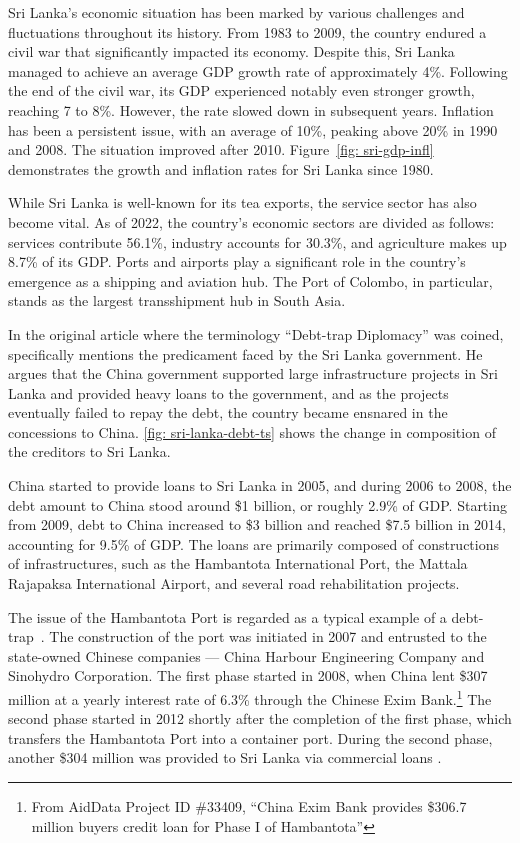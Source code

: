 Sri Lanka's economic situation has been marked by various challenges and fluctuations throughout its history. From 1983 to 2009, the country endured a civil war that significantly impacted its economy. Despite this, Sri Lanka managed to achieve an average GDP growth rate of approximately 4\%. Following the end of the civil war, its GDP experienced notably even stronger growth, reaching 7 to 8\%. However, the rate slowed down in subsequent years. Inflation has been a persistent issue, with an average of 10\%, peaking above 20\% in 1990 and 2008. The situation improved after 2010. Figure~\ref{fig: sri-gdp-infl} demonstrates the growth and inflation rates for Sri Lanka since 1980.

While Sri Lanka is well-known for its tea exports, the service sector has also become vital. As of 2022, the country's economic sectors are divided as follows: services contribute 56.1\%, industry accounts for 30.3\%, and agriculture makes up 8.7\% of its GDP. Ports and airports play a significant role in the country's emergence as a shipping and aviation hub. The Port of Colombo, in particular, stands as the largest transshipment hub in South Asia.

In the original article where the terminology ``Debt-trap Diplomacy'' was coined, \citet{Chellaney_2017} specifically mentions the predicament faced by the Sri Lanka government. He argues that the China government supported large infrastructure projects in Sri Lanka and provided heavy loans to the government, and as the projects eventually failed to repay the debt, the country became ensnared in the concessions to China. \autoref{fig: sri-lanka-debt-ts} shows the change in composition of the creditors to Sri Lanka.

China started to provide loans to Sri Lanka in 2005, and during 2006 to 2008, the debt amount to China stood around \$1 billion, or roughly 2.9\% of GDP. Starting from 2009, debt to China increased to \$3 billion and reached \$7.5 billion in 2014, accounting for 9.5\% of GDP. The loans are primarily composed of constructions of infrastructures, such as the Hambantota International Port, the Mattala Rajapaksa International Airport, and several road rehabilitation projects.

The issue of the Hambantota Port is regarded as a typical example of a debt-trap~\citep*{Moramudali_2020}.
The construction of the port was initiated in 2007 and entrusted to the state-owned Chinese companies --- China Harbour Engineering Company and Sinohydro Corporation.
The first phase started in 2008, when China lent \$307 million at a yearly interest rate of 6.3\% through the Chinese Exim Bank.\footnote{
    From AidData Project ID \#33409, ``China Exim Bank provides \$306.7 million buyers credit loan for Phase I of Hambantota''}
The second phase started in 2012 shortly after the completion of the first phase, which transfers the Hambantota Port into a container port\cite{}. During the second phase, another \$304 million was provided to Sri Lanka via commercial loans \citep{Horn-Reinhart-Trebesch-21}.



